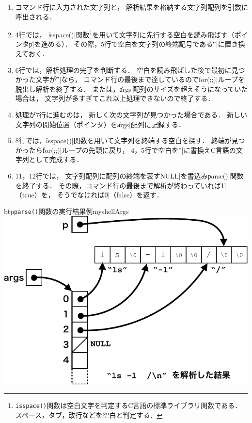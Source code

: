 

\begin{enumerate}
\item コマンド行に入力された文字列と，
  解析結果を格納する文字列配列を引数に呼出される．
\item 4行では，
  \|isspace()|関数\footnote{
    \texttt{isspace()}関数は空白文字を判定するC言語の標準ライブラリ関数である．
    スペース，タブ，改行などを空白と判定する．
  }を用いて文字列に先行する空白を読み飛ばす（ポインタ\|p|を進める）．
  その際，5行で空白を文字列の終端記号である\|'\0'|に置き換えておく．
\item 6行では，解析処理の完了を判断する．
  空白を読み飛ばした後で最初に見つかった文字が\|'\0'|なら，
  コマンド行の最後まで達しているので\|for(;;)|ループを脱出し解析を終了する．
  または，\|args|配列のサイズを超えそうになっていた場合は，
  文字列が多すぎてこれ以上処理できないので終了する．
\item 処理が7行に進むのは，
  新しく次の文字列が見つかった場合である．
  新しい文字列の開始位置（ポインタ）を\|args|配列に記録する．
\item 8行では，\|isspace()|関数を用いて文字列を終端する空白を探す．
  終端が見つかったら\|for(;;)|ループの先頭に戻り，
  4，5行で空白を\|'\0'|に書換えC言語の文字列として完成する．
\item 11，12行では，
  文字列配列に配列の終端を表す\|NULL|を書込み\|parse()|関数を終了する．
  その際，コマンド行の最後まで解析が終わっていれば\|1|（true）を，
  そうでなければ\|0|（false）を返す．
\end{enumerate}

\begin{myfig}{btp}{\texttt{parse()}関数の実行結果例}{myshellArgs}
  \includegraphics[scale=0.8]{Fig/myshellArgs-crop.pdf}
\end{myfig}

